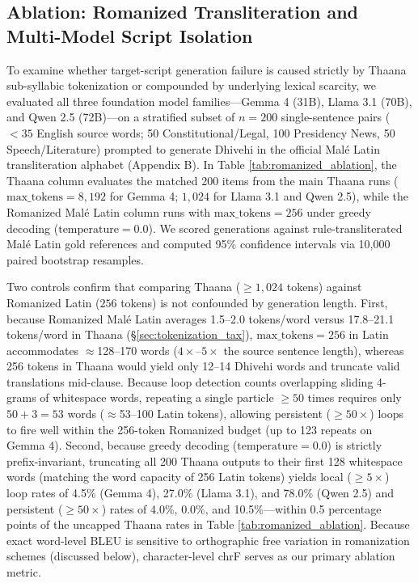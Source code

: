 \documentclass[acmsmall,review,anonymous]{acmart}
\begin{document}
\subsection{Ablation: Romanized Transliteration and Multi-Model Script Isolation}
\label{sec:ablation-romanized}
To examine whether target-script generation failure is caused strictly by Thaana sub-syllabic tokenization or compounded by underlying lexical scarcity, we evaluated all three foundation model families---Gemma 4 (31B), Llama 3.1 (70B), and Qwen 2.5 (72B)---on a stratified subset of $n=200$ single-sentence pairs ($<35$ English source words; 50 Constitutional/Legal, 100 Presidency News, 50 Speech/Literature) prompted to generate Dhivehi in the official Mal\'{e} Latin transliteration alphabet (Appendix B). In Table \ref{tab:romanized_ablation}, the Thaana column evaluates the matched 200 items from the main Thaana runs ($\text{max\_tokens} = 8,192$ for Gemma 4; $1,024$ for Llama 3.1 and Qwen 2.5), while the Romanized Mal\'{e} Latin column runs with $\text{max\_tokens} = 256$ under greedy decoding ($\text{temperature} = 0.0$). We scored generations against rule-transliterated Mal\'{e} Latin gold references and computed 95\% confidence intervals via 10,000 paired bootstrap resamples.

Two controls confirm that comparing Thaana ($\ge 1,024$ tokens) against Romanized Latin ($256$ tokens) is not confounded by generation length. First, because Romanized Mal\'{e} Latin averages 1.5--2.0 tokens/word versus 17.8--21.1 tokens/word in Thaana (\S\ref{sec:tokenization_tax}), $\text{max\_tokens} = 256$ in Latin accommodates $\approx$128--170 words ($4\times\text{--}5\times$ the source sentence length), whereas 256 tokens in Thaana would yield only 12--14 Dhivehi words and truncate valid translations mid-clause. Because loop detection counts overlapping sliding 4-grams of whitespace words, repeating a single particle $\ge 50$ times requires only $50 + 3 = 53$ words ($\approx$53--100 Latin tokens), allowing persistent ($\ge 50\times$) loops to fire well within the 256-token Romanized budget (up to 123 repeats on Gemma 4). Second, because greedy decoding ($\text{temperature} = 0.0$) is strictly prefix-invariant, truncating all 200 Thaana outputs to their first 128 whitespace words (matching the word capacity of 256 Latin tokens) yields local ($\ge 5\times$) loop rates of 4.5\% (Gemma 4), 27.0\% (Llama 3.1), and 78.0\% (Qwen 2.5) and persistent ($\ge 50\times$) rates of 4.0\%, 0.0\%, and 10.5\%---within 0.5 percentage points of the uncapped Thaana rates in Table \ref{tab:romanized_ablation}. Because exact word-level BLEU is sensitive to orthographic free variation in romanization schemes (discussed below), character-level chrF serves as our primary ablation metric.
\end{document}
